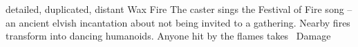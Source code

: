   {detailed, duplicated, distant}%
  {Wax}%
  {Fire}%
  {}%
  {The caster sings the Festival of Fire song -- an ancient elvish incantation about not being invited to a gathering.
    Nearby fires transform into dancing humanoids.
    Anyone hit by the flames takes \showDam\ Damage}%
  {}

